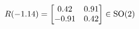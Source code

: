 \documentclass[preview]{standalone}
\begin{document}
\begin{align*}
\special{dvisvgm:raw <g id='unique000'>}R(-1.14) = \begin{bmatrix} 0.42 & 0.91 \\ -0.91 & 0.42 \end{bmatrix} \in \text{SO}(2)\special{dvisvgm:raw </g>}
\end{align*}
\end{document}

